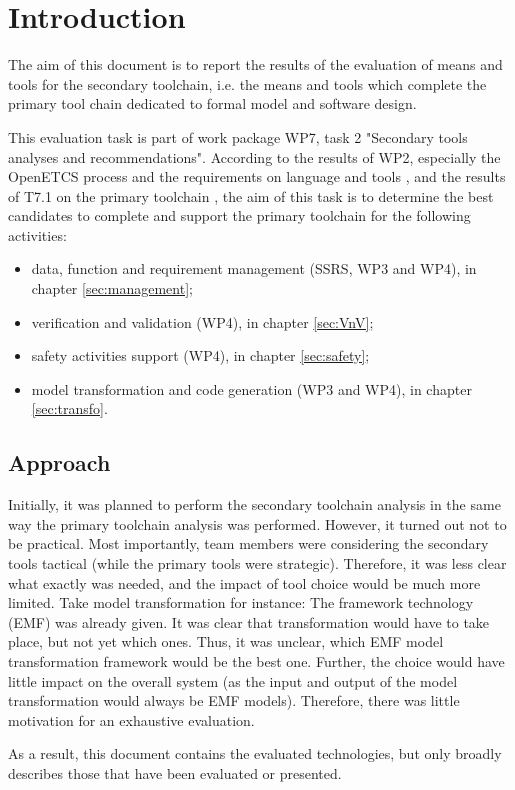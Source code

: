 

\chapter{Introduction}
\label{sec:intro}

The aim of this document is to report the results of the evaluation of means and tools for the secondary toolchain, i.e. the means and tools which complete the primary tool chain dedicated to formal model and software design.

This evaluation task is part of work package WP7, task 2 "Secondary  tools analyses and recommendations". According to the results of WP2, especially the OpenETCS process and the
requirements on language and tools \citep{D2_6}, and the results of T7.1 on the primary toolchain \citep{D7.1},  the aim of this task is to determine the best candidates to complete and support the primary toolchain for the following activities:

\begin{itemize}
\item data, function and requirement management (SSRS, WP3 and WP4), in chapter \ref{sec:management};
\item verification and  validation (WP4), in chapter \ref{sec:VnV};
\item safety activities support (WP4), in chapter \ref{sec:safety};
\item model transformation and code generation (WP3 and WP4), in chapter \ref{sec:transfo}.
\end{itemize}

\section{Approach}

Initially, it was planned to perform the secondary toolchain analysis in the same way the primary toolchain analysis was performed. However, it turned out not to be practical. Most importantly, team members were considering the secondary tools tactical (while the primary tools were strategic). Therefore, it was less clear what exactly was needed, and the impact of tool choice would be much more limited. Take model transformation for instance: The framework technology (EMF) was already given. It was clear that transformation would have to take place, but not yet which ones. Thus, it was unclear, which EMF model transformation framework would be the best one. Further, the choice would have little impact on the overall system (as the input and output of the model transformation would always be EMF models). Therefore, there was little motivation for an exhaustive evaluation.

As a result, this document contains the evaluated technologies, but only broadly describes those that have been evaluated or presented.





